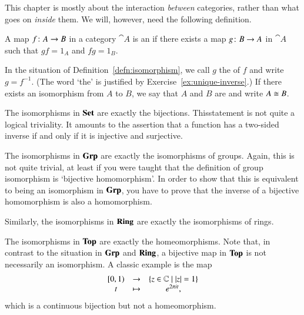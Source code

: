 This chapter is mostly about the interaction \emph{between} categories,
rather than what goes on \emph{inside} them.  We will, however, need the
following definition.

\begin{defn}
\label{defn:isomorphism}
A map $f\from A \to B$ in a category $\cat{A}$ is an %
%
%
if there exists a map $g\from B \to A$ in $\cat{A}$ such that $gf = 1_A$
and $fg = 1_B$.
\end{defn}

In the situation of Definition~\ref{defn:isomorphism}, we call $g$ the
%
%
%
of $f$ and write $g = f^{-1}$.%
%
%
(The word `the' is justified by Exercise~\ref{ex:unique-inverse}.)  If
there exists an isomorphism from $A$ to $B$, we say that $A$ and $B$ are
 and write $A \cong B$.%
%
%

\begin{example}
\label{eg:iso-Set}
The isomorphisms in $\mathbf{Set}$%
%
%
are exactly the bijections.  This\linebreak statement is not quite a logical
triviality.  It amounts to the assertion that a function has a two-sided
inverse if and only if it is injective and surjective.
\end{example}

\begin{example}
The isomorphisms in $\mathbf{Grp}$%
%
%
are exactly the isomorphisms of groups.  Again, this is not quite trivial,
at least if you were taught that the definition of group isomorphism is
`bijective homomorphism'.  In order to show that this is equivalent to
being an isomorphism in $\mathbf{Grp}$, you have to prove that the inverse of a
bijective homomorphism is also a homomorphism.

Similarly, the isomorphisms in $\mathbf{Ring}$%
%
%
are exactly the isomorphisms of rings.
\end{example}

\begin{example}
The isomorphisms in $\mathbf{Top}$%
%
%
are exactly the homeomorphisms.  Note that, in contrast to the situation in
$\mathbf{Grp}$ and $\mathbf{Ring}$, a bijective map in $\mathbf{Top}$ is not necessarily an
isomorphism.  A classic example is the map
\[
\begin{array}{ccc}
[0, 1)  &\to            &\{z \in \mathbb{C} \mathrel{|} \left|z\right| = 1\}     \\
t       &\mapsto        &e^{2\pi i t},
\end{array}
\]
which is a continuous bijection but not a homeomorphism.
\end{example}

